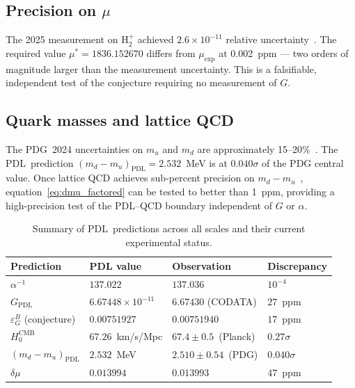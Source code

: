 \documentclass[11pt,a4paper]{article}
\theoremstyle{definition}
\newcommand{\PDL}{\textnormal{PDL}}
\newcommand{\epsg}{\varepsilon_G}
\newcommand{\muexp}{\mu_{\mathrm{exp}}}
\newcommand{\mustar}{\mu^*}
\newcommand{\dmu}{\delta\mu}
\begin{document}
\subsection{Precision on \texorpdfstring{$\mu$}{mu}}

The 2025 measurement on H$_2^+$ achieved $2.6\times10^{-11}$ relative uncertainty~\cite{Alighanbari_2025}. The required value $\mustar = 1836.152670$ differs from $\muexp$ at 0.002~ppm --- two orders of magnitude larger than the measurement uncertainty. This is a falsifiable, independent test of the conjecture requiring no measurement of $G$.

\subsection{Quark masses and lattice QCD}

The PDG~2024 uncertainties on $m_u$ and $m_d$ are approximately 15--20\%~\cite{PDG_2024}. The \PDL\ prediction $(m_d-m_u)_{\mathrm{PDL}} = 2.532$~MeV is at $0.040\sigma$ of the PDG central value. Once lattice QCD achieves sub-percent precision on $m_d - m_u$~\cite{Fodor_2016,FLAG_2024}, equation~\eqref{eq:dmu_factored} can be tested to better than 1~ppm, providing a high-precision test of the PDL--QCD boundary independent of $G$ or $\alpha$.

\begin{table}[ht]
\centering
\caption{Summary of \PDL\ predictions across all scales and their current experimental status.}
\label{tab:summary}
\bigskip
\begin{tabular}{p{4.5cm}p{3.2cm}p{3.2cm}p{3.2cm}}
\toprule
Prediction & PDL value & Observation & Discrepancy \\
\midrule
$\alpha^{-1}$ & $137.022$ & $137.036$ & $10^{-4}$ \\
$G_{\mathrm{PDL}}$ & $6.67448\times10^{-11}$ & $6.67430$ (CODATA) & $27$~ppm \\
$\epsg^B$ (conjecture) & $0.00751927$ & $0.00751940$ & $17$~ppm \\
$H_0^{\mathrm{CMB}}$ & $67.26$~km/s/Mpc & $67.4\pm0.5$~(Planck) & $0.27\sigma$ \\
$(m_d-m_u)_{\mathrm{PDL}}$ & $2.532$~MeV & $2.510\pm0.54$~(PDG) & $0.040\sigma$ \\
$\dmu$ & $0.013994$ & $0.013993$ & $47$~ppm \\
\bottomrule
\end{tabular}
\end{table}

\end{document}

